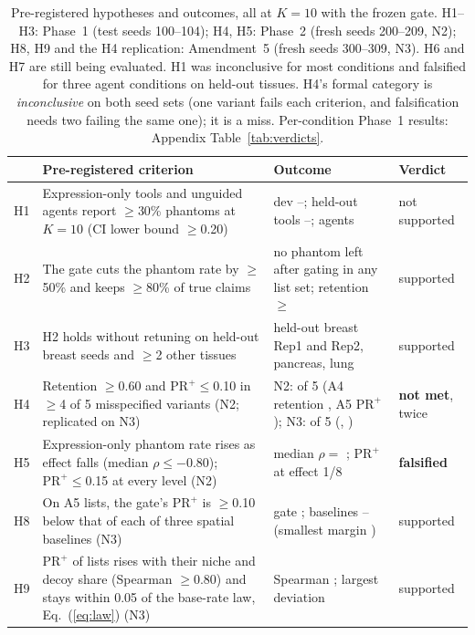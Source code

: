 \documentclass[letterpaper]{article} %
\begin{document}
\begin{table}[t]
\centering
\small
\begin{tabular}{@{}lp{6.3cm}p{5.6cm}l@{}}
\toprule
 & Pre-registered criterion & Outcome & Verdict \\
\midrule
H1 & Expression-only tools and unguided agents report $\geq$30\% phantoms at $K{=}10$ (CI lower bound $\geq$0.20)
   & dev \devBreastReponeProdKTenPR{}--\devBreastReponeCpdbKTenPR{}; held-out tools
     \testPancreasCpdbKTenPR{}--\testBreastReponeCpdbKTenPR{}; agents \agTestAllBothPR{}
   & not supported \\
H2 & The gate cuts the phantom rate by $\geq$50\% and keeps $\geq$80\% of true claims
   & no phantom left after gating in any list set; retention $\geq$\agDevBreastReponeGeminiRet{}
   & supported \\
H3 & H2 holds without retuning on held-out breast seeds and $\geq$2 other tissues
   & held-out breast Rep1 and Rep2, pancreas, lung
   & supported \\
H4 & Retention $\geq$0.60 and $\mathrm{PR}^{+}\leq$0.10 in $\geq$4 of 5 misspecified variants (N2; replicated on N3)
   & N2: \hfourNmet{} of 5 (A4 retention \hfourAfourRet{}, A5 $\mathrm{PR}^{+}$ \hfourAfivePRafter{});
     N3: \hfourNthreeNmet{} of 5 (\hfourNthreeAfourRet{}, \hfourNthreeAfivePRafter{})
   & \textbf{not met}, twice \\
H5 & Expression-only phantom rate rises as effect falls (median $\rho\leq-0.80$); $\mathrm{PR}^{+}\leq$0.15 at every
     level (N2)
   & median $\rho=$ \hfiveMedRho{}; $\mathrm{PR}^{+}$ \hfiveDefaultEighthPRafter{} at effect 1/8
   & \textbf{falsified} \\
H8 & On A5 lists, the gate's $\mathrm{PR}^{+}$ is $\geq$0.10 below that of each of three spatial baselines (N3)
   & gate \sbGateFPS{}; baselines \sbNhoodFPS{}--\sbSpatialdmFPS{} (smallest margin \sbNhoodMargin{})
   & supported \\
H9 & $\mathrm{PR}^{+}$ of lists rises with their niche and decoy share (Spearman $\geq$0.80) and stays within 0.05 of
     the base-rate law, Eq.~(\ref{eq:law}) (N3)
   & Spearman \brRho{}; largest deviation \brMaxDiff{}
   & supported \\
\bottomrule
\end{tabular}
\caption{Pre-registered hypotheses and outcomes, all at $K{=}10$ with the frozen gate. H1--H3: Phase~1 (test seeds
100--104); H4, H5: Phase~2 (fresh seeds 200--209, N2); H8, H9 and the H4 replication: Amendment~5 (fresh seeds
300--309, N3). H6 and H7 are still being evaluated. H1 was inconclusive for most conditions and falsified for three
agent conditions on held-out tissues. H4's formal category is \emph{inconclusive} on both seed sets (one variant fails
each criterion, and falsification needs two failing the same one); it is a miss. Per-condition Phase~1 results:
Appendix Table~\ref{tab:verdicts}.}
\label{tab:hyp}
\end{table}
\end{document}
